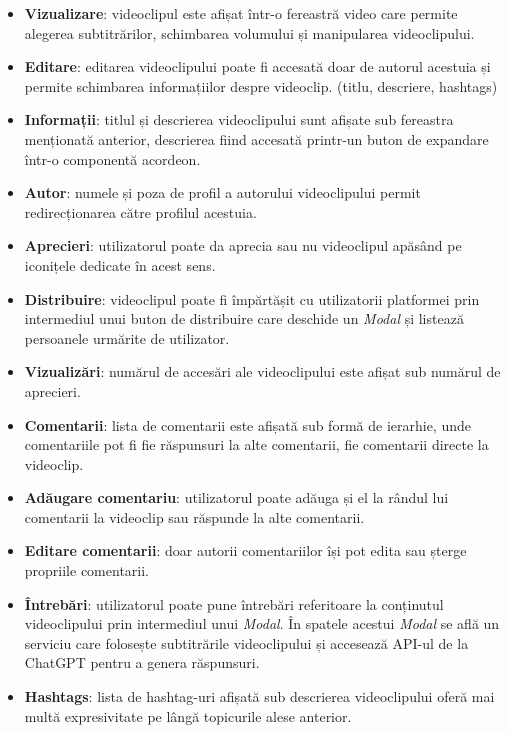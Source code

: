\begin{itemize}
    \item \textbf{Vizualizare}: videoclipul este afișat într-o fereastră video care
    permite alegerea subtitrărilor, schimbarea volumului și manipularea videoclipului.
    \item \textbf{Editare}: editarea videoclipului poate fi accesată doar de autorul acestuia
    și permite schimbarea informațiilor despre videoclip. (titlu, descriere, hashtags)
    \item \textbf{Informații}: titlul și descrierea videoclipului sunt afișate sub fereastra
    menționată anterior, descrierea fiind accesată printr-un buton de expandare într-o componentă
    acordeon.
    \item \textbf{Autor}: numele și poza de profil a autorului videoclipului permit
    redirecționarea către profilul acestuia.
    \item \textbf{Aprecieri}: utilizatorul poate da aprecia sau nu videoclipul apăsând pe
    iconițele dedicate în acest sens.
    \item \textbf{Distribuire}: videoclipul poate fi împărtășit cu utilizatorii platformei
    prin intermediul unui buton de distribuire care deschide un \textit{Modal} și listează
    persoanele urmărite de utilizator.
    \item \textbf{Vizualizări}: numărul de accesări ale videoclipului este afișat sub numărul
    de aprecieri.
    \item \textbf{Comentarii}: lista de comentarii este afișată sub formă de ierarhie, unde
    comentariile pot fi fie răspunsuri la alte comentarii, fie comentarii directe la videoclip.
    \item \textbf{Adăugare comentariu}: utilizatorul poate adăuga și el la rândul lui comentarii la videoclip
    sau răspunde la alte comentarii.
    \item \textbf{Editare comentarii}: doar autorii comentariilor își pot edita sau șterge propriile comentarii.
    \item \textbf{Întrebări}: utilizatorul poate pune întrebări referitoare la conținutul videoclipului
    prin intermediul unui \textit{Modal}. În spatele acestui \textit{Modal} se află un serviciu care
    folosește subtitrările videoclipului și accesează API-ul de la ChatGPT pentru a genera răspunsuri.
    \item \textbf{Hashtags}: lista de hashtag-uri afișată sub descrierea videoclipului oferă mai
    multă expresivitate pe lângă topicurile alese anterior.
\end{itemize}

